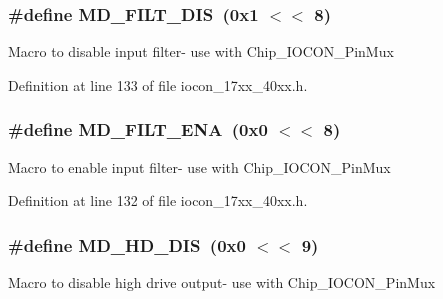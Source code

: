 \subsubsection[{\texorpdfstring{M\+D\+\_\+\+F\+I\+L\+T\+\_\+\+D\+IS}{MD_FILT_DIS}}]{\setlength{\rightskip}{0pt plus 5cm}\#define M\+D\+\_\+\+F\+I\+L\+T\+\_\+\+D\+IS~(0x1 $<$$<$ 8)}\hypertarget{group__IOCON__17XX__40XX_gad67d4495f8a8568bdedbaa13aceb2d3d}{}\label{group__IOCON__17XX__40XX_gad67d4495f8a8568bdedbaa13aceb2d3d}
Macro to disable input filter-\/ use with Chip\+\_\+\+I\+O\+C\+O\+N\+\_\+\+Pin\+Mux 

Definition at line 133 of file iocon\+\_\+17xx\+\_\+40xx.\+h.

\subsubsection[{\texorpdfstring{M\+D\+\_\+\+F\+I\+L\+T\+\_\+\+E\+NA}{MD_FILT_ENA}}]{\setlength{\rightskip}{0pt plus 5cm}\#define M\+D\+\_\+\+F\+I\+L\+T\+\_\+\+E\+NA~(0x0 $<$$<$ 8)}\hypertarget{group__IOCON__17XX__40XX_ga0bbfc0ef84fc75d356d7fd36cd23527e}{}\label{group__IOCON__17XX__40XX_ga0bbfc0ef84fc75d356d7fd36cd23527e}
Macro to enable input filter-\/ use with Chip\+\_\+\+I\+O\+C\+O\+N\+\_\+\+Pin\+Mux 

Definition at line 132 of file iocon\+\_\+17xx\+\_\+40xx.\+h.

\subsubsection[{\texorpdfstring{M\+D\+\_\+\+H\+D\+\_\+\+D\+IS}{MD_HD_DIS}}]{\setlength{\rightskip}{0pt plus 5cm}\#define M\+D\+\_\+\+H\+D\+\_\+\+D\+IS~(0x0 $<$$<$ 9)}\hypertarget{group__IOCON__17XX__40XX_ga324ed23a726e0788749899278b0ce61a}{}\label{group__IOCON__17XX__40XX_ga324ed23a726e0788749899278b0ce61a}
Macro to disable high drive output-\/ use with Chip\+\_\+\+I\+O\+C\+O\+N\+\_\+\+Pin\+Mux 

